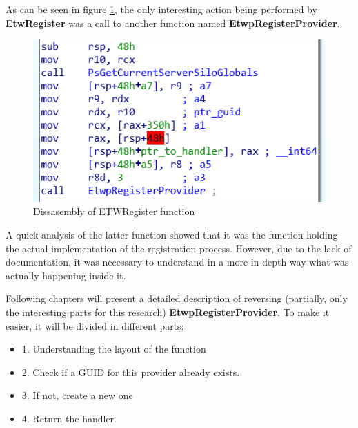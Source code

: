 As can be seen in figure \ref{fig:etwRegister_code}, the only interesting action being performed by {\bfseries EtwRegister} was a call to another function named {\bfseries EtwpRegisterProvider}. 

\begin{centering}
\begin{figure}[H]
  \includegraphics[width=12cm]{images/etwRegister_code.png}
  \caption[]{Dissasembly of ETWRegister function}
  \label{fig:etwRegister_code}
\end{figure}
\end{centering}

A quick analysis of the latter function showed that it was the function holding the actual implementation of the registration process. However, due to the lack of documentation, it was necessary to understand in a more in-depth way what was actually happening inside it.

Following chapters will present a detailed description of reversing (partially, only the interesting parts for this research) {\bfseries EtwpRegisterProvider}. 
To make it easier, it will be divided in different parts:

\begin{itemize}
  \setlength\itemsep{0.05em}
  \item 1. Understanding the layout of the function
  \item 2. Check if a GUID for this provider already exists.
  \item 3. If not, create a new one
  \item 4. Return the handler.
\end{itemize}

